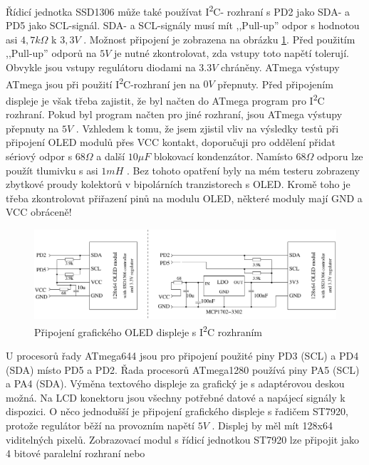 Řídicí jednotka SSD1306 může také používat I\textsuperscript{2}C- rozhraní s PD2 jako SDA- a PD5 jako SCL-signál.
SDA- a SCL-signály musí mít ,,Pull-up'' odpor s hodnotou asi \(4,7k\Omega\) k \(3,3V\) .
Možnost připojení je zobrazena na obrázku \ref{fig:ssd1306i2c}.
Před použitím ,,Pull-up'' odporů na \(5V\) je nutné zkontrolovat, zda vstupy toto napětí tolerují.
Obvykle jsou vstupy regulátoru diodami na \(3.3V\) chráněny.
ATmega výstupy ATmega jsou při použití I\textsuperscript{2}C-rozhraní jen na  \(0V\) přepnuty.
Před připojením displeje je však třeba zajistit, že byl načten do ATmega program pro I\textsuperscript{2}C rozhraní.
Pokud byl program načten pro jiné rozhraní, jsou ATmega výstupy přepnuty na \(5V\) .
Vzhledem k tomu, že jsem zjistil vliv na výsledky testů při připojení OLED modulů přes VCC kontakt,
doporučuji pro oddělení přidat sériový odpor s \(68\Omega\) a další \(10\mu F\) blokovací kondenzátor. 
Namísto \(68\Omega\) odporu lze použít tlumivku s asi \(1mH\) .
Bez tohoto opatření byly na mém testeru zobrazeny zbytkové proudy kolektorů v bipolárních tranzistorech s OLED.
Kromě toho je třeba zkontrolovat přiřazení pinů na modulu OLED, některé moduly mají GND a VCC obráceně!
\vspace{-0.3cm} 
\begin{figure}[H]
\centering
\includegraphics[width=14cm]{../FIG/SSD1306_I2C.pdf}
\vspace{-0.3cm} 
\caption{Připojení grafického OLED displeje s I\textsuperscript{2}C rozhraním}
\label{fig:ssd1306i2c}
\end{figure}
\vspace{-0.4cm} 
U procesorů řady ATmega644 jsou pro připojení použité piny PD3 (SCL) a PD4 (SDA) místo PD5 a PD2.
Řada procesorů ATmega1280 používá piny PA5 (SCL) a PA4 (SDA).
Výměna textového displeje za grafický je s adaptérovou deskou možná.
Na LCD konektoru jsou všechny potřebné datové a napájecí signály k dispozici.
O něco jednodušší je připojení grafického displeje s řadičem ST7920, protože
regulátor běží na provozním napětí \(5V\) .
Displej by měl mít 128x64 viditelných pixelů.
Zobrazovací modul s řídicí jednotkou ST7920  lze připojit jako 4 bitové paralelní rozhraní nebo
